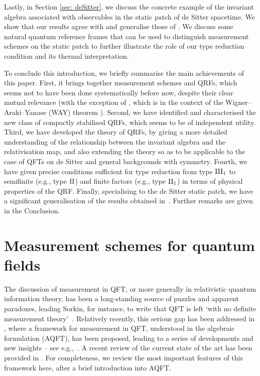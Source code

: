\documentclass[sn-mathphys-num]{sn-jnl}%
\numberwithin{equation}{section}
\theoremstyle{thmstyleone}%
\theoremstyle{thmstyletwo}%
\theoremstyle{thmstylethree}%
\begin{document}
Lastly, in Section \ref{sec: deSitter}, we discuss the concrete example of the invariant algebra associated with observables in the static patch of de Sitter spacetime. We show that our results agree with and generalise those of \cite{chandrasekaran2023algebra}. We discuss some natural quantum reference frames that can be used to distinguish measurement schemes on the static patch to further illustrate the role of our type reduction condition and its thermal interpretation.

To conclude this introduction, we briefly summarise the main achievements of this paper. First, it brings 
together measurement schemes and QRFs, which seems not to have been done systematically before now, despite their clear mutual relevance (with the exception of \cite{Loveridge2020a}, which is in the context of the Wigner--Araki--Yanase (WAY) theorem \cite{E.Wigner1952,Busch2010,Araki1960,Loveridge2011}). Second, we have identified and characterised the new class of compactly stabilised QRFs, which seems to be of independent utility. Third, we have developed the theory of QRFs, by giving a more detailed understanding of the relationship between the invariant algebra and the relativisation map, and also extending the theory 
so as to be applicable to the case of QFTs on de Sitter and general backgrounds with symmetry.
Fourth, we have given precise conditions sufficient for type reduction from type $\textnormal{III}_1$ to semifinite (e.g., type $\textnormal{II}$) and finite factors (e.g., type $\textnormal{II}_1$) in terms of physical properties of the QRF. Finally, specialising to the de Sitter static patch, we have a significant generalisation of the results obtained in~\cite{chandrasekaran2023algebra}. Further remarks are given in the Conclusion.


\section{Measurement schemes for quantum fields}\label{sec: measurement in QFT}

The discussion of measurement in QFT, or more generally in relativistic quantum information theory, has been a long-standing source of puzzles and apparent paradoxes, leading Sorkin,
for instance, to write that QFT is left `with no definite measurement theory'~\cite{sorkin1993impossible}. Relatively recently, this serious gap has been addressed in \cite{FewVer_QFLM:2018}, where a framework for measurement in QFT, understood in the algebraic formulation (AQFT), has been proposed, leading to a series of developments and new insights -- see e.g.,~\cite{BostelmannFewsterRuep:2020,FewsterJubbRuep:2022}. A recent review of the current state of the art has been provided in \cite{FewsterVerch_encyc:2023}. For completeness, we review the most important features of this framework here, after a brief introduction into AQFT.
\end{document}
